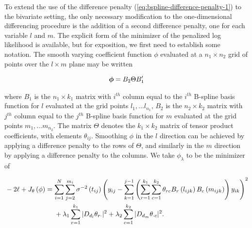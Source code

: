 To extend the use of the difference penalty (\ref{eq:bspline-difference-penalty-1}) to the bivariate setting, the only necessary modification to the one-dimensional differencing procedure is the addition of a second difference penalty, one for each variable $l$ and $m$. The explicit form of the minimizer of the penalized log likelihood is available, but for exposition, we first need to establish some notation. The smooth varying coefficient function $\phi$ evaluated at a $n_1 \times n_2$ grid of points over the $l \times m$ plane may be written 

\begin{equation*} 
\mbox{\boldmath $\phi$} = B_2 \Theta B'_1
\end{equation*}

\noindent 
where $B_1$ is the $n_1 \times k_1$ matrix with $i^{th}$ column equal to the $i^{th}$ B-spline basis function for $l$ evaluated at the grid points $l_1,\dots l_{n_1}$,  $B_2$ is the $n_2 \times k_2$ matrix with $j^{th}$ column equal to the $j^{th}$ B-spline basis function for $m$ evaluated at the grid points $m_1,\dots m_{n_2}$. The matrix $\Theta$ denotes the $k_1 \times k_2$ matrix of tensor product coefficients, with elements $\theta_{ij}$. Smoothing $\phi$ in the $l$ direction can be achieved by applying a difference penalty to the rows of $\Theta$, and similarly in the $m$ direction by applying a difference penalty to the columns. We take $\phi_\lambda$ to be the minimizer of 

\begin{align} 
\begin{split}\label{eq:folded-difference-penalty-log-likelihood}
&-2\ell + J_\theta \left(\phi\right) = \sum_{i=1}^N \sum_{j=2}^{m_i} \sigma^{-2}\left({t_{ij}}\right) \left(y_{ij} - \sum_{k=1}^{j-1} \left( \sum_{r=1}^{k_1} \sum_{c=1}^{k_2} \theta_{rc} B_r\left(l_{ijk}\right)B_c\left(m_{ijk}\right)\right)y_{ik} \right)^2 \\ 
&\phantom{{}-2\ell + J_\theta \left(\phi\right) = {}} + \lambda_1 \sum_{r=1}^{k_1} \vert D_{d_{\ms l}} \theta_{r \cdot} \vert^2 + \lambda_2 \sum_{c=1}^{k_2} \vert D_{d_{\ms m}} \theta_{\cdot c} \vert^2.
\end{split}
\end{align}

